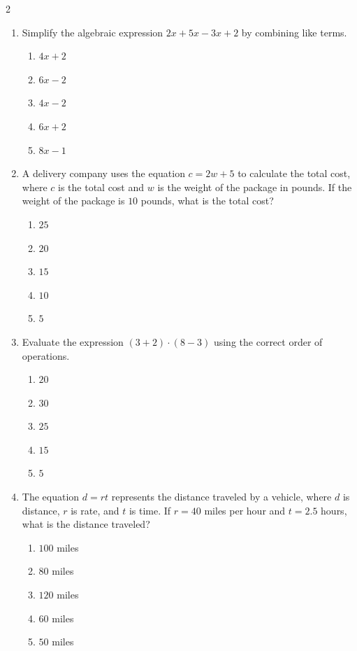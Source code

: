 \documentclass[10pt]{article}
\begin{document}
\begin{multicols}{2}
\begin{enumerate}[label=\textbf{Q\arabic*.}, leftmargin=*, itemsep=6pt, parsep=0pt]
  \item \small Simplify the algebraic expression $2x + 5x - 3x + 2$ by combining like terms.
  \begin{enumerate}[label=(\Alph*), leftmargin=0.6cm, nosep, itemsep=2pt]
    \item $4x + 2$
    \item $6x - 2$
    \item $4x - 2$
    \item $6x + 2$
    \item $8x - 1$
  \end{enumerate}

  \item \small A delivery company uses the equation $c = 2w + 5$ to calculate the total cost, where $c$ is the total cost and $w$ is the weight of the package in pounds. If the weight of the package is $10$ pounds, what is the total cost?
  \begin{enumerate}[label=(\Alph*), leftmargin=0.6cm, nosep, itemsep=2pt]
    \item $25$
    \item $20$
    \item $15$
    \item $10$
    \item $5$
  \end{enumerate}

  \item \small Evaluate the expression $(3 + 2) \cdot (8 - 3)$ using the correct order of operations.
  \begin{enumerate}[label=(\Alph*), leftmargin=0.6cm, nosep, itemsep=2pt]
    \item $20$
    \item $30$
    \item $25$
    \item $15$
    \item $5$
  \end{enumerate}

  \item \small The equation $d = rt$ represents the distance traveled by a vehicle, where $d$ is distance, $r$ is rate, and $t$ is time. If $r = 40$ miles per hour and $t = 2.5$ hours, what is the distance traveled?
  \begin{enumerate}[label=(\Alph*), leftmargin=0.6cm, nosep, itemsep=2pt]
    \item $100$ miles
    \item $80$ miles
    \item $120$ miles
    \item $60$ miles
    \item $50$ miles
  \end{enumerate}


\end{enumerate}
\end{multicols}
\end{document}

